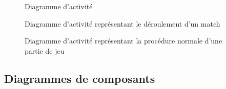 \documentclass[a4paper]{report}
\begin{document}
\begin{figure}[H]
    \caption{Diagramme d'activité}
\end{figure}

\begin{figure}[H]
    \caption{\label{3} Diagramme d'activité représentant le déroulement d'un match}
\end{figure}

\begin{figure}[H]
    \caption{\label{3} Diagramme d'activité représentant la procédure normale d'une partie de jeu}
\end{figure}

\subsection{Diagrammes de composants}



\end{document}
